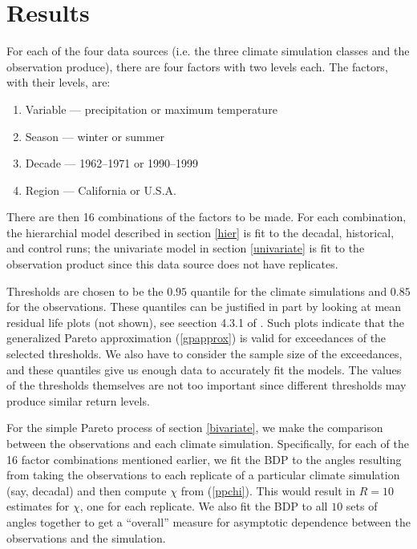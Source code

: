 \section{Results}
\label{results}

For each of the four data sources (i.e. the three climate simulation classes and the observation produce), there are four factors with two levels each. The factors, with their levels, are:
\begin{enumerate}
\item Variable --- precipitation or maximum temperature
\item Season --- winter or summer
\item Decade --- 1962--1971 or 1990--1999
\item Region --- California or U.S.A.
\end{enumerate}
There are then 16 combinations of the factors to be made. For each combination, the hierarchial model described in section \ref{hier} is fit to the decadal, historical, and control runs; the univariate model in section \ref{univariate} is fit to the observation product since this data source does not have replicates.

Thresholds are chosen to be the $0.95$ quantile for the climate simulations and $0.85$ for the observations. These quantiles can be justified in part by looking at mean residual life plots (not shown), see seection 4.3.1 of \cite{coles2001introduction}. Such plots indicate that the generalized Pareto approximation (\ref{gpapprox}) is valid for exceedances of the selected thresholds. We also have to consider the sample size of the exceedances, and these quantiles give us enough data to accurately fit the models. The values of the thresholds themselves are not too important since different thresholds may produce similar return levels.

For the simple Pareto process of section \ref{bivariate}, we make the comparison between the observations and each climate simulation. Specifically, for each of the 16 factor combinations mentioned earlier, we fit the BDP to the angles resulting from taking the observations to each replicate of a particular climate simulation (say, decadal) and then compute $\chi$ from (\ref{ppchi}). This would result in $R=10$ estimates for $\chi$, one for each replicate. We also fit the BDP to all $10$ sets of angles together to get a ``overall'' measure for asymptotic dependence between the observations and the simulation.

